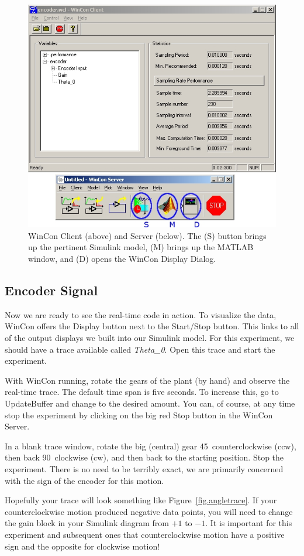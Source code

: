 \begin{figure}[hbt]
\centering
\includegraphics[width=.6\textwidth]{clientserver}
\caption{ \footnotesize
        WinCon Client (above) and Server (below).  The (S) button brings up the pertinent Simulink model, (M) brings up the MATLAB window, and (D) opens the WinCon Display Dialog.
        \label{fig.clientserver}
        }
\end{figure}

\subsection{Encoder Signal}
Now we are ready to see the real-time code in action.  To visualize the data, WinCon offers the Display button next to the Start/Stop button.  This links to all of the output displays we built into our Simulink model.  For this experiment, we should have a trace available called \textit{Theta\_0}.  Open this trace and start the experiment.
\par
With WinCon running, rotate the gears of the plant (by hand) and observe the real-time trace.  The default time span is five seconds.  To increase this, go to Update\textrightarrow Buffer and change to the desired amount.  You can, of course, at any time stop the experiment by clicking on the big red Stop button in the WinCon Server.
\par
In a blank trace window, rotate the big (central) gear 45\textdegree\ counterclockwise (ccw), then back 90\textdegree\ clockwise (cw), and then back to the starting position.  Stop the experiment.  There is no need to be terribly exact, we are primarily concerned with the sign of the encoder for this motion.
\par
Hopefully your trace will look something like Figure~\ref{fig.angletrace}.  If your counterclockwise motion produced negative data points, you will need to change the gain block in your Simulink diagram from $+1$ to $-1$.  It is important for this experiment and subsequent ones that counterclockwise motion have a positive sign and the opposite for clockwise motion!

